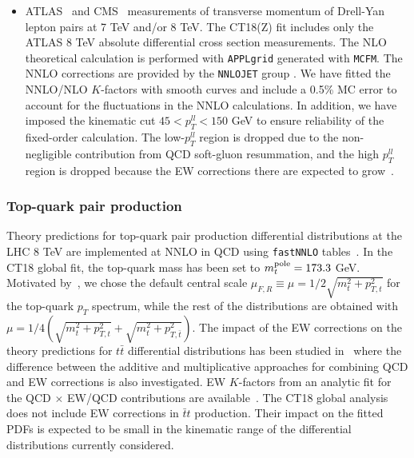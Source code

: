\begin{itemize}
\item ATLAS~\cite{Aad:2014xaa,Aad:2015auj} and CMS~\cite{Khachatryan:2015oaa} measurements of transverse momentum of Drell-Yan lepton pairs at 7 TeV and/or 8 TeV. 
The CT18(Z) fit includes only the ATLAS 8 TeV absolute differential cross section measurements. The NLO theoretical calculation is performed with \texttt{APPLgrid} generated with \texttt{MCFM}. The NNLO corrections are provided by the \texttt{NNLOJET} group \cite{Ridder:2015dxa,Gehrmann-DeRidder:2017mvr}.
We have fitted the NNLO/NLO $K$-factors with smooth curves and include a 0.5\% MC error to account for the fluctuations in the NNLO calculations.
In addition, we have imposed the kinematic cut $45\!<\!p_{T}^{ll}\!<\!150$ GeV  to ensure reliability of the fixed-order calculation. 
The low-$p_{T}^{ll}$ region is dropped due to the non-negligible contribution from QCD soft-gluon resummation, and the high $p_{T}^{ll}$ region is dropped because the EW corrections there are expected to grow~\cite{Hollik:2015pja,Kallweit:2015fta}.
%
%
%

\end{itemize}

\subsubsection{Top-quark pair production
\label{sec:TheoryTop}
}
%
Theory predictions for top-quark pair production differential distributions at the LHC 8 TeV are implemented at NNLO in QCD using
\texttt{fastNNLO} tables~\cite{Czakon:2017dip,fastnnlo:grids}. 
In the CT18 global fit, the top-quark mass has been set to $m_t^{\rm pole}=173.3$ GeV. Motivated by~\cite{Czakon:2016dgf}, we chose the default central scale
$\mu_{F,R}\equiv \mu =1/2\sqrt{m_t^2 + p_{T,t}^2}$ for the top-quark $p_T$ spectrum, while the rest of the distributions are obtained with
$\mu=1/4\left(\sqrt{m_t^2 + p_{T,t}^2} + \sqrt{m_t^2 + p_{T,\bar{t}}^2}\right)$.
The impact of the EW corrections on the theory predictions for $t \bar{t}$ differential distributions has been studied in~\cite{Czakon:2017wor} 
where the difference between the additive and
multiplicative approaches for combining QCD and EW corrections is also investigated. EW $K$-factors 
from an analytic fit for the QCD $\times$ EW/QCD contributions are  available~\cite{EW:kfac}. 
The CT18 global analysis does not include EW corrections in $\bar{t} t$ production. Their impact on the fitted PDFs is expected to be small in the kinematic range of the differential distributions currently considered.   

